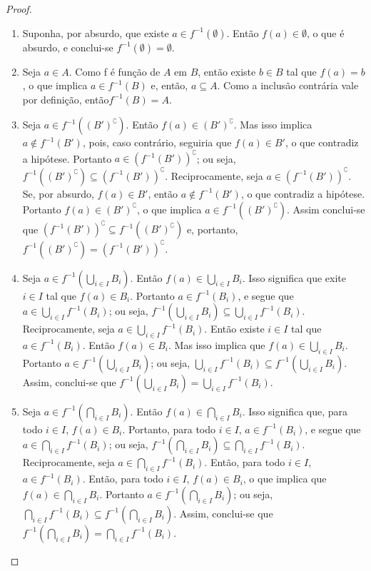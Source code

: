 \begin{proof}
	\begin{enumerate}
	\item Suponha, por absurdo, que existe $a \in f^{-1}(\emptyset)$. Então $f(a) \in \emptyset$, o que é absurdo, e conclui-se $f^{-1}(\emptyset) = \emptyset$.
	\item Seja $a \in A$. Como f é função de $A$ em $B$, então existe $b \in B$ tal que $f(a)=b$, o que implica $a \in f^{-1}(B)$ e, então, $a \subseteq A$. Como a inclusão contrária vale por definição, então$f^{-1}(B) = A$.
	\item Seja $a \in f^{-1}((B')^\complement)$. Então $f(a) \in (B')^\complement$. Mas isso implica $a \notin f^{-1}(B')$, pois, caso contrário, seguiria que $f(a) \in B'$, o que contradiz a hipótese. Portanto $a \in (f^{-1}(B'))^\complement$; ou seja, $f^{-1}((B')^\complement) \subseteq (f^{-1}(B'))^\complement$. Reciprocamente, seja $a \in (f^{-1}(B'))^\complement$. Se, por absurdo, $f(a) \in B'$, então $a \notin f^{-1}(B')$, o que contradiz a hipótese. Portanto $f(a) \in (B')^\complement$, o que implica $a \in f^{-1}((B')^\complement)$. Assim conclui-se que $(f^{-1}(B'))^\complement \subseteq f^{-1}((B')^\complement)$ e, portanto, $f^{-1}((B')^\complement) = (f^{-1}(B'))^\complement$.
	\item Seja $a \in f^{-1}(\bigcup_{i \in I} B_i)$. Então $f(a) \in \bigcup_{i \in I} B_i$. Isso significa que exite $i \in I$ tal que $f(a) \in B_i$. Portanto $a \in f^{-1}(B_i)$, e segue que $a \in \bigcup_{i \in I} f^{-1}(B_i)$; ou seja, $f^{-1}(\bigcup_{i \in I} B_i) \subseteq \bigcup_{i \in I} f^{-1}(B_i)$. Reciprocamente, seja $a \in \bigcup_{i \in I} f^{-1}(B_i)$. Então existe $i \in I$ tal que $a \in f^{-1}(B_i)$. Então $f(a) \in B_i$. Mas isso implica que $f(a) \in \bigcup_{i \in I} B_i$. Portanto $a \in f^{-1}(\bigcup_{i \in I} B_i)$; ou seja, $\bigcup_{i \in I} f^{-1}(B_i) \subseteq f^{-1}(\bigcup_{i \in I} B_i)$. Assim, conclui-se que $f^{-1}(\bigcup_{i \in I} B_i) = \bigcup_{i \in I} f^{-1}(B_i)$.
	\item Seja $a \in f^{-1}(\bigcap_{i \in I} B_i)$. Então $f(a) \in \bigcap_{i \in I} B_i$. Isso significa que, para todo $i \in I$, $f(a) \in B_i$. Portanto, para todo $i \in I$, $a \in f^{-1}(B_i)$, e segue que $a \in \bigcap_{i \in I} f^{-1}(B_i)$; ou seja, $f^{-1}(\bigcap_{i \in I} B_i) \subseteq \bigcap_{i \in I} f^{-1}(B_i)$. Reciprocamente, seja $a \in \bigcap_{i \in I} f^{-1}(B_i)$. Então, para todo $i \in I$, $a \in f^{-1}(B_i)$. Então, para todo $i \in I$, $f(a) \in B_i$, o que implica que $f(a) \in \bigcap_{i \in I} B_i$. Portanto $a \in f^{-1}(\bigcap_{i \in I} B_i)$; ou seja, $\bigcap_{i \in I} f^{-1}(B_i) \subseteq f^{-1}(\bigcap_{i \in I} B_i)$. Assim, conclui-se que $f^{-1}(\bigcap_{i \in I} B_i) = \bigcap_{i \in I} f^{-1}(B_i)$.
\qedhere
	\end{enumerate}
\end{proof}

